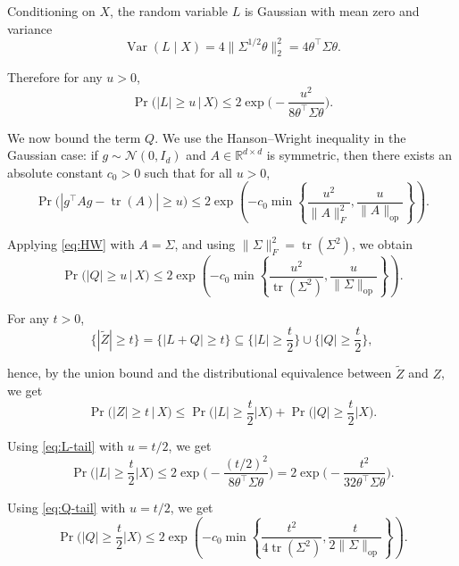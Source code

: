 Conditioning on $X$, the random variable $L$ is Gaussian with mean zero and variance
\[
\operatorname{Var}(L \mid X)
= 4\|\Sigma^{1/2}\theta\|_2^2
= 4\theta^\top\Sigma\theta.
\]

Therefore for any $u>0$,
\begin{equation}
\Pr\big(|L|\ge u \,\big|\, X\big)
\le 2\exp\Big(-\frac{u^2}{8\theta^\top\Sigma\theta}\Big).
\label{eq:L-tail}
\end{equation}

We now bound the term $Q$. We use the Hanson--Wright inequality in the Gaussian case:
if $g \sim \mathcal{N}(0,I_d)$ and $A \in \mathbb{R}^{d\times d}$ is symmetric, then
there exists an absolute constant $c_0 > 0$ such that for all $u>0$,
\begin{equation}
\Pr\big(|g^\top A g - \operatorname{tr}(A)| \ge u\big)
\le 2\exp\left(
  -c_0 \min\left\{
      \frac{u^2}{\|A\|_F^2},
      \frac{u}{\|A\|_{\mathrm{op}}}
  \right\}
\right).
\label{eq:HW}
\end{equation}

Applying \eqref{eq:HW} with $A = \Sigma$, and using
$\|\Sigma\|_F^2 = \operatorname{tr}(\Sigma^2)$, we obtain
\begin{equation}
\Pr\big(|Q|\ge u \,\big|\, X\big)
\le 2\exp\left(
  -c_0 \min\left\{
      \frac{u^2}{\operatorname{tr}(\Sigma^2)},
      \frac{u}{\|\Sigma\|_{\mathrm{op}}}
  \right\}
\right).
\label{eq:Q-tail}
\end{equation}


For any $t>0$,
\[
\{|\tilde Z|\ge t\}
= \{|L+Q|\ge t\}
\subseteq \Big\{|L|\ge \frac{t}{2}\Big\} \cup \Big\{|Q|\ge \frac{t}{2}\Big\},
\]

hence, by the union bound and the distributional equivalence between $\tilde Z$ and $Z$, we get
\begin{equation}
\Pr\big(|Z|\ge t \,\big|\, X\big)
\le \Pr\Big(|L|\ge \frac{t}{2} \Big| X\Big)
 +  \Pr\Big(|Q|\ge \frac{t}{2} \Big| X\Big).
\label{eq:Z-union}
\end{equation}

Using \eqref{eq:L-tail} with $u = t/2$, we get
\[
\Pr\Big(|L|\ge \frac{t}{2} \Big| X\Big)
\le 2\exp\Big(-\frac{(t/2)^2}{8\theta^\top\Sigma\theta}\Big)
= 2\exp\Big(-\frac{t^2}{32\theta^\top\Sigma\theta}\Big).
\]

Using \eqref{eq:Q-tail} with $u = t/2$, we get
\[
\Pr\Big(|Q|\ge \frac{t}{2} \Big| X\Big)
\le 2\exp\left(
  -c_0 \min\left\{
      \frac{t^2}{4\operatorname{tr}(\Sigma^2)},
      \frac{t}{2\|\Sigma\|_{\mathrm{op}}}
  \right\}
\right).
\]


